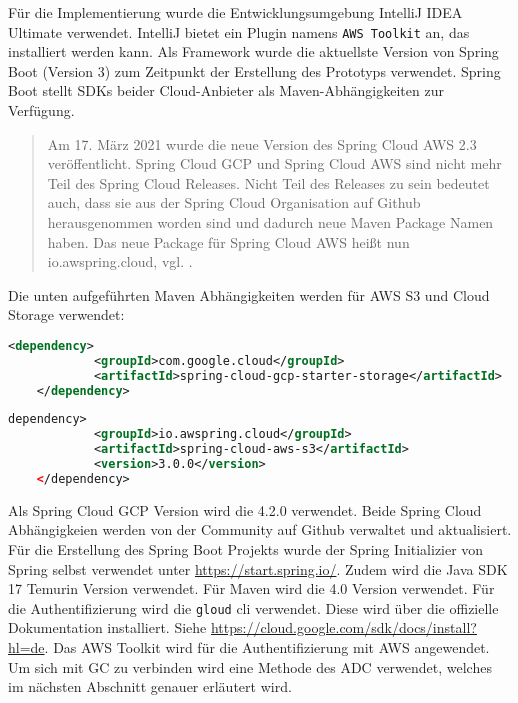 Für die Implementierung wurde die Entwicklungsumgebung IntelliJ IDEA Ultimate verwendet. IntelliJ bietet ein Plugin namens \verb|AWS Toolkit| an, das installiert werden kann. Als Framework wurde die aktuellste Version von Spring Boot (Version 3) zum Zeitpunkt der Erstellung des Prototyps verwendet. Spring Boot stellt SDKs beider Cloud-Anbieter als Maven-Abhängigkeiten zur Verfügung.

\begin{quote}
	Am 17. März 2021 wurde die neue Version des Spring Cloud AWS 2.3 veröffentlicht. Spring Cloud GCP und Spring Cloud AWS sind nicht mehr Teil des Spring Cloud Releases. Nicht Teil des Releases zu sein bedeutet auch, dass sie aus der Spring Cloud Organisation auf Github herausgenommen worden sind und dadurch neue Maven Package Namen haben. Das neue Package für Spring Cloud AWS heißt nun \glqq io.awspring.cloud\grqq, vgl. \cite{spring-cloud-announce}. 
\end{quote}

Die unten aufgeführten Maven Abhängigkeiten werden für AWS S3 und Cloud Storage verwendet:

\begin{lstlisting}[language=XML]
	<dependency>
        	<groupId>com.google.cloud</groupId>
        	<artifactId>spring-cloud-gcp-starter-storage</artifactId>
    </dependency>
\end{lstlisting}

\begin{lstlisting}[language=XML]
	dependency>
        	<groupId>io.awspring.cloud</groupId>
        	<artifactId>spring-cloud-aws-s3</artifactId>
        	<version>3.0.0</version>
    </dependency>
\end{lstlisting}

Als Spring Cloud GCP Version wird die 4.2.0 verwendet. Beide Spring Cloud Abhängigkeien werden von der Community auf Github verwaltet und aktualisiert. Für die Erstellung des Spring Boot Projekts wurde der Spring Initializier von Spring selbst verwendet unter \url{https://start.spring.io/}. Zudem wird die Java SDK 17 Temurin Version verwendet. Für Maven wird die 4.0 Version verwendet. Für die Authentifizierung wird die \verb|gloud| cli verwendet. Diese wird über die offizielle Dokumentation installiert. Siehe \url{https://cloud.google.com/sdk/docs/install?hl=de}. Das AWS Toolkit wird für die Authentifizierung mit AWS angewendet. Um sich mit GC zu verbinden wird eine Methode des ADC verwendet, welches im nächsten Abschnitt genauer erläutert wird.

